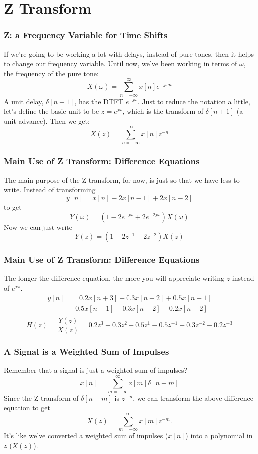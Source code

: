 \documentclass{beamer}
\begin{document}
\section{Z Transform}
\setcounter{subsection}{1}

\begin{frame}
  \frametitle{Z: a Frequency Variable for Time Shifts}

  If we're going to be working a lot with delays, instead of pure
  tones, then it helps to change our frequency variable.
  Until now, we've been working in terms of $\omega$, the frequency of the pure tone:
  \[
  X(\omega) = \sum_{n=-\infty}^\infty x[n]e^{-j\omega n}
  \]
  A unit delay, $\delta[n-1]$, has the DTFT $e^{-j\omega}$.
  Just to reduce the notation a little, let's define the basic unit to be
  $z=e^{j\omega}$, which is the transform of $\delta[n+1]$ (a unit advance).  Then we  get:
  \[
  X(z)   = \sum_{n=-\infty}^\infty x[n]z^{-n}
  \]
\end{frame}

\begin{frame}
  \frametitle{Main Use of Z Transform: Difference Equations}
  
  The main purpose of the Z transform, for now, is just so that we have less to write.
  Instead of transforming
  \[
  y[n] = x[n] - 2x[n-1] + 2x[n-2]
  \]
  to get
  \[
  Y(\omega) = \left(1-2e^{-j\omega}+2e^{-2j\omega}\right)X(\omega)
  \]
  Now we can just write
  \[
  Y(z) = \left(1-2z^{-1}+2z^{-2}\right) X(z)
  \]
\end{frame}

\begin{frame}
  \frametitle{Main Use of Z Transform: Difference Equations}
  
  The longer the difference equation, the more you will appreciate
  writing $z$ instead of $e^{j\omega}$.
  \begin{align*}
    y[n] &= 0.2x[n+3]+0.3x[n+2]+0.5x[n+1]\\
    &-0.5x[n-1]-0.3x[n-2]-0.2x[n-2]\\
  \end{align*}
  \[
  H(z)=\frac{Y(z)}{X(z)} = 0.2z^{3}+0.3z^{2}+0.5z^{1}-0.5z^{-1}-0.3z^{-2}-0.2z^{-3}
  \]
\end{frame}

\begin{frame}
  \frametitle{A Signal is a Weighted Sum of Impulses}
  
  Remember that a signal is just a weighted sum of impulses?
  \[
  x[n] = \sum_{m=-\infty}^\infty x[m]\delta[n-m]
  \]
  Since the Z-transform of $\delta[n-m]$ is $z^{-m}$, we can transform
  the above difference equation to get
  \[
  X(z) = \sum_{m=-\infty}^\infty x[m]z^{-m}.
  \]
  It's like we've converted a weighted  sum of impulses ($x[n]$)  into a
  polynomial in $z$ ($X(z)$).
\end{frame}
\end{document}
